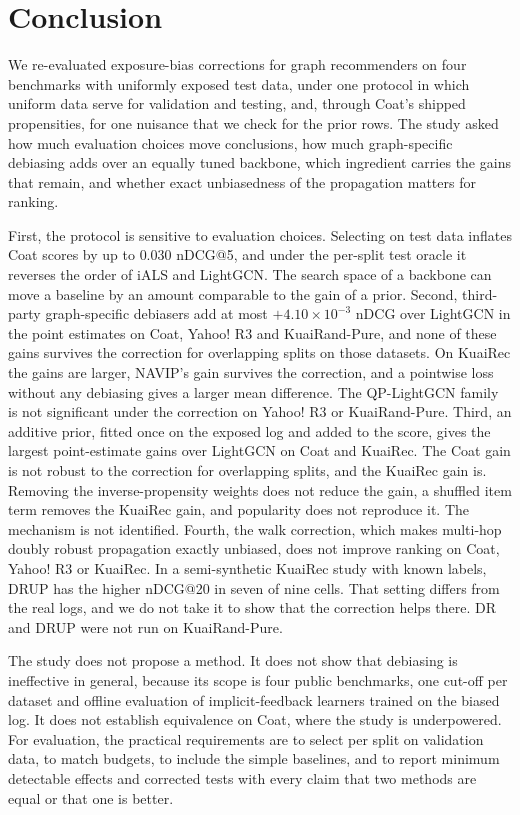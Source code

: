 \section{Conclusion}\label{sec:conclusion}

We re-evaluated exposure-bias corrections for graph recommenders on four benchmarks with uniformly exposed test data,
under one protocol in which uniform data serve for validation and testing, and, through Coat's shipped propensities,
for one nuisance that we check for the prior rows. The study asked how much evaluation choices move conclusions, how
much graph-specific debiasing adds over an equally tuned backbone, which ingredient carries the gains that remain, and
whether exact unbiasedness of the propagation matters for ranking.

First, the protocol is sensitive to evaluation choices. Selecting on test data inflates Coat scores by up to $0.030$
nDCG@5, and under the per-split test oracle it reverses the order of iALS and LightGCN. The search space of a backbone
can move a baseline by an amount comparable to the gain of a prior. Second, third-party graph-specific debiasers add at
most $+4.10\times10^{-3}$ nDCG over LightGCN in the point estimates on Coat, Yahoo! R3 and KuaiRand-Pure, and none of
these gains survives the correction for overlapping splits on those datasets. On KuaiRec the gains are larger, NAVIP's
gain survives the correction, and a pointwise loss without any debiasing gives a larger mean difference. The QP-LightGCN
family is not significant under the correction on Yahoo! R3 or KuaiRand-Pure. Third, an additive prior, fitted once on
the exposed log and added to the score, gives the largest point-estimate gains over LightGCN on Coat and KuaiRec. The
Coat gain is not robust to the correction for overlapping splits, and the KuaiRec gain is. Removing the
inverse-propensity weights does not reduce the gain, a shuffled item term removes the KuaiRec gain, and popularity does
not reproduce it. The mechanism is not identified. Fourth, the walk correction, which makes multi-hop doubly robust
propagation exactly unbiased, does not improve ranking on Coat, Yahoo! R3 or KuaiRec. In a semi-synthetic KuaiRec study
with known labels, DRUP has the higher nDCG@20 in seven of nine cells. That setting differs from the real logs, and we
do not take it to show that the correction helps there. DR and DRUP were not run on KuaiRand-Pure.

The study does not propose a method. It does not show that debiasing is ineffective in general, because its scope is
four public benchmarks, one cut-off per dataset and offline evaluation of implicit-feedback learners trained on the
biased log. It does not establish equivalence on Coat, where the study is underpowered. For evaluation, the practical
requirements are to select per split on validation data, to match budgets, to include the simple baselines, and to
report minimum detectable effects and corrected tests with every claim that two methods are equal or that one is
better.
